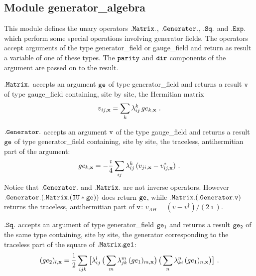 \subsection{Module generator\_algebra}  
\label{generatoralgebra}

This module defines the unary operators $\tt .Matrix.$, $\tt .Generator.$,
$\tt .Sq. $ and $\tt .Exp.$ which perform some special operations
involving generator fields.  The operators accept arguments of the
type generator\_field or gauge\_field and return as result a variable
of one of these types.  The $\tt parity$ and $\tt dir$ components of the
argument are passed on to the result.

$\tt .Matrix.$ accepts an argument $\tt ge$ of type generator\_field
and returns a result $\tt v$ of type gauge\_field containing, site by site, 
the Hermitian matrix
%
\begin{equation}
v_{ij,{\bf x}} =\sum_k \lambda^k_{ij}\, ge_{k,{\bf x}} \ .
\label{matrix}
\end{equation}
%

$\tt .Generator.$ accepts an argument  $\tt v$ of the type gauge\_field
and returns a result $\tt ge$ of type generator\_field containing, 
site by site, the traceless, antihermitian part of the argument: 
%
\begin{equation}
ge_{k,{\bf x}} = -{\imath \over 4} \sum_{ij}\lambda^k_{ij}\, (v_{ji,\bf x}
-v^*_{ij,\bf x}) \ .
\label{gen}
\end{equation}
%
Notice that $\tt .Generator.$ and $\tt .Matrix.$ are not inverse
operators.  However $\tt .Generator.(.Matrix.(IU*ge))$ does return $\tt ge$,
while $\tt .Matrix.(.Generator.v)$ returns the traceless, 
antihermitian part of $\tt v$: $v_{\scriptscriptstyle{AH}}=
(v-v^{\dagger}) / (2 \imath)$.

$\tt .Sq.$ accepts an argument of type generator\_field $\tt ge_1$ 
and returns a result $\tt ge_2$ of the same type containing, site by site, 
the generator corresponding to the traceless part of the square 
of $\tt .Matrix.ge1$: 
%
\begin{equation}
(ge_2)_{l,{\bf x}} = 
{ 1 \over 2} \sum_{ijk} \big[ \lambda^l_{ij} \,
\big( \sum_m \lambda^m_{jk}\, (ge_1)_{ m,{\bf x}} \big) \,
\big( \sum_n \lambda^n_{ki}\, (ge_1)_{ n,{\bf x}} \big) 
\big]\ .
\label{sq}
\end{equation}
%

